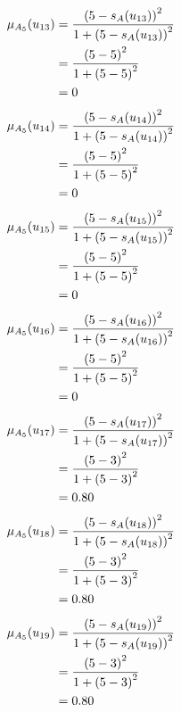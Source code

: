 \documentclass[a4paper]{book}
\begin{document}
				\begin{align}
					\mu_{A_5}(u_{13}) &= \frac{\left(5-s_A(u_{13})\right)^2}{1 + \left(5-s_A(u_{13})\right)^2}\\
					&= \frac{\left(5-5\right)^2}{1 + \left(5-5\right)^2} \notag \\
					&= 0 \notag
				\end{align}
				\begin{align}
					\mu_{A_5}(u_{14}) &= \frac{\left(5-s_A(u_{14})\right)^2}{1 + \left(5-s_A(u_{14})\right)^2}\\
					&= \frac{\left(5-5\right)^2}{1 + \left(5-5\right)^2} \notag \\
					&= 0 \notag
				\end{align}
				\begin{align}
					\mu_{A_5}(u_{15}) &= \frac{\left(5-s_A(u_{15})\right)^2}{1 + \left(5-s_A(u_{15})\right)^2}\\
					&= \frac{\left(5-5\right)^2}{1 + \left(5-5\right)^2} \notag \\
					&= 0 \notag
				\end{align}
				\begin{align}
					\mu_{A_5}(u_{16}) &= \frac{\left(5-s_A(u_{16})\right)^2}{1 + \left(5-s_A(u_{16})\right)^2}\\
					&= \frac{\left(5-5\right)^2}{1 + \left(5-5\right)^2} \notag \\
					&= 0 \notag
				\end{align}
				\begin{align}
					\mu_{A_5}(u_{17}) &= \frac{\left(5-s_A(u_{17})\right)^2}{1 + \left(5-s_A(u_{17})\right)^2}\\
					&= \frac{\left(5-3\right)^2}{1 + \left(5-3\right)^2} \notag \\
					&= 0.80 \notag
				\end{align}
				\begin{align}
					\mu_{A_5}(u_{18}) &= \frac{\left(5-s_A(u_{18})\right)^2}{1 + \left(5-s_A(u_{18})\right)^2}\\
					&= \frac{\left(5-3\right)^2}{1 + \left(5-3\right)^2} \notag \\
					&= 0.80 \notag
				\end{align}
				\begin{align}
					\mu_{A_5}(u_{19}) &= \frac{\left(5-s_A(u_{19})\right)^2}{1 + \left(5-s_A(u_{19})\right)^2}\\
					&= \frac{\left(5-3\right)^2}{1 + \left(5-3\right)^2} \notag \\
					&= 0.80 \notag
				\end{align}
\end{document}
